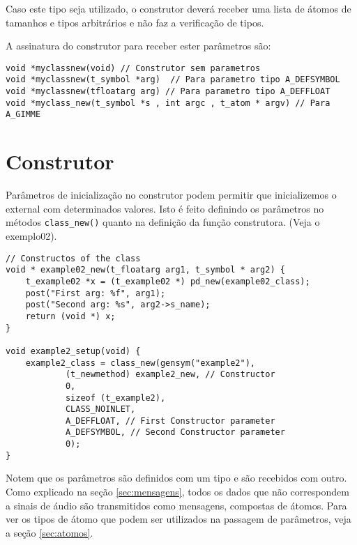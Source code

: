 Caso este tipo seja utilizado, o construtor deverá receber uma lista de átomos
de tamanhos e tipos arbitrários e não faz a verificação de tipos.

A assinatura do construtor para receber ester parâmetros são:

\begin{lstlisting}[caption=Assinatura do construtor]
void *myclassnew(void) // Construtor sem parametros
void *myclassnew(t_symbol *arg)  // Para parametro tipo A_DEFSYMBOL
void *myclassnew(tfloatarg arg) // Para parametro tipo A_DEFFLOAT
void *myclass_new(t_symbol *s , int argc , t_atom * argv) // Para A_GIMME
\end{lstlisting}

\section{Construtor}

Parâmetros de inicialização no construtor podem permitir que inicializemos o
external com determinados valores. Isto é feito definindo os parâmetros no
métodos \texttt{class\_new()} quanto na definição da função construtora. (Veja o
exemplo02).

\begin{lstlisting}[caption=Passagem de parâmetro para o construtor]
// Constructos of the class
void * example02_new(t_floatarg arg1, t_symbol * arg2) {
    t_example02 *x = (t_example02 *) pd_new(example02_class);
    post("First arg: %f", arg1);
    post("Second arg: %s", arg2->s_name);
    return (void *) x;
}

void example2_setup(void) {
    example2_class = class_new(gensym("example2"),
            (t_newmethod) example2_new, // Constructor
            0,
            sizeof (t_example2),
            CLASS_NOINLET,
            A_DEFFLOAT, // First Constructor parameter
            A_DEFSYMBOL, // Second Constructor parameter
            0);
}
\end{lstlisting}

Notem que os parâmetros são definidos com um tipo e são recebidos com outro.
Como explicado na seção \ref{sec:mensagens}, todos os dados que não
correspondem a sinais de áudio são transmitidos como mensagens, compostas de
átomos.
Para ver os tipos de átomo que podem ser utilizados na passagem de parâmetros,
veja a seção \ref{sec:atomos}.

